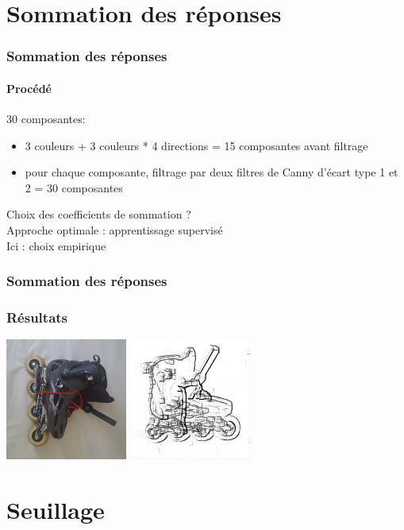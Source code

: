 \documentclass[french]{beamer}
\begin{document}
\section{Sommation des réponses}

\begin{frame}
	\frametitle{Sommation des réponses}
	\framesubtitle{Procédé}
	30 composantes:
	\begin{itemize}
		\item 3 couleurs + 3 couleurs * 4 directions = 15 composantes avant filtrage
		\item pour chaque composante, filtrage par deux filtres de Canny d'écart type 1 et 2 = 30 composantes
	\end{itemize}
	Choix des coefficients de sommation ?\\
	Approche optimale : apprentissage supervisé\\
	Ici : choix empirique
\end{frame}

\begin{frame}
	\frametitle{Sommation des réponses}
	\frametitle{Résultats}
	\includegraphics[width=4cm]{images/roller.png} \; \includegraphics[width = 4cm]{images/roller_resn.jpg}
\end{frame}

\section{Seuillage}
\end{document}
